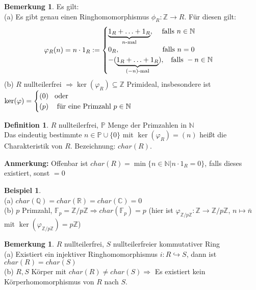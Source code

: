 \documentclass[10pt,a4paper,numbers=endperiod]{scrreprt}
\theoremstyle{definition}
\newtheorem{defi}[satz]{Definition}
\newtheorem{bem}[satz]{Bemerkung}
\newtheorem{bsp}[satz]{Beispiel}
\def\QQ{{\mathbb Q}}
\def\CC{{\mathbb C}}
\def\RR{{\mathbb R}}
\def\NN{{\mathbb N}}
\def\ZZ{{\mathbb Z}}
\def\PP{{\mathbb P}}
\def\FF{{\mathbb F}}
\begin{document}
\begin{bem}
	Es gilt:\\
	(a) Es gibt genau einen Ringhomomorphismus $\phi_R: \ZZ \rightarrow R$. Für diesen gilt:\\
	\begin{align*}
		\varphi_R(n) = n \cdot 1_R := \begin{cases}
		\underbrace{1_R + \ldots + 1_R}_{n \text{-mal}}, \hspace{3mm} \text{ falls } n \in \NN\\
		0_R, \hspace{20mm} \text{ falls } n = 0\\
		-(\underbrace{1_R + \ldots + 1_R}_{(-n) \text{-mal}}), \hspace{2mm} \text{ falls } -n \in \NN
		\end{cases}
	\end{align*}
	(b) $R$ nullteilerfrei $\Rightarrow \ker(\varphi_R) \subseteq \ZZ$ Primideal, insbesondere ist $\ker(\varphi) = \begin{cases}
		(0) \hspace{3mm} \text{oder}\\
		(p) \hspace{3mm} \text{ für eine Primzahl } p \in \NN
	\end{cases}$
\end{bem}

\begin{defi}
	$R$ nullteilerfrei, $\PP$ Menge der Primzahlen in $\NN$\\
	Das eindeutig bestimmte $n \in \PP \cup \{0\}$ mit $\ker(\varphi_R) = (n)$ heißt die Charakteristik von $R$. Bezeichnung: $char(R)$.
\end{defi}

\textbf{Anmerkung:} Offenbar ist $char(R) = \min\{n \in \NN| n \cdot 1_R = 0\}$, falls dieses existiert, sonst $= 0$

\begin{bsp}
	$ $\\
	(a) $char(\QQ) = char(\RR) = char(\CC) = 0$\\
	(b) $p$ Primzahl, $\FF_p = \ZZ/p\ZZ \Rightarrow char(\FF_p) = p$ (hier ist $\varphi_{\ZZ/p\ZZ}: \ZZ \rightarrow \ZZ/p\ZZ$, $n \mapsto \bar{n}$ mit $\ker(\varphi_{\ZZ/p\ZZ}) = p\ZZ$)
\end{bsp}

\begin{bem}
	$R$ nullteilerfrei, $S$ nullteilerfreier kommutativer Ring\\
	(a) Existiert ein injektiver Ringhomomorphismus $i: R \hookrightarrow S$, dann ist $char(R) = char(S)$\\
	(b) $R, S$ Körper mit $char(R) \neq char(S) \Rightarrow$ Es existiert kein Körperhomomorphismus von $R$ nach $S$.
\end{bem}
\end{document}
